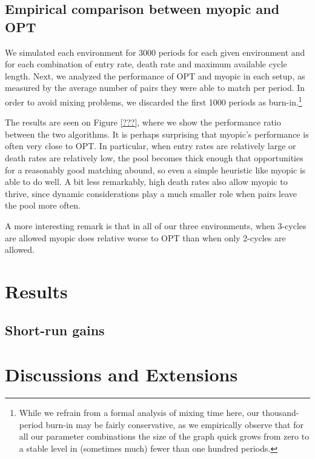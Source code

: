 \documentclass[12pt]{article}
\begin{document}
\subsection{Empirical comparison between myopic and OPT}

We simulated each environment for 3000 periods for each given environment and for each combination of entry rate, death rate and maximum available cycle length. Next, we analyzed the performance of OPT and myopic in each setup, as measured by the average number of pairs they were able to match per period. In order to avoid mixing problems, we discarded the first 1000 periods as burn-in.\footnote{While we refrain from a formal analysis of mixing time here, our thousand-period burn-in may be fairly conservative, as we empirically observe that for all our parameter combinations the size of the graph quick grows from zero to a stable level in (sometimes much) fewer than one hundred periods.}

The results are seen on Figure \ref{???}, where we show the performance ratio between the two algorithms. It is perhaps surprising that myopic's performance is often very close to OPT. In particular, when entry rates are relatively large or death rates are relatively low, the pool becomes thick enough that  opportunities for a reasonably good matching abound, so even a simple heuristic like myopic is able to do well. A bit less remarkably, high death rates also allow myopic to thrive, since dynamic considerations play a much smaller role when pairs leave the pool more often.

A more interesting remark is that in all of our three environments, when 3-cycles are allowed myopic does relative worse to OPT than when only 2-cycles are allowed. 




\section{Results} \label{sec:result}

\clearpage
\subsection{Short-run gains}

\section{Discussions and Extensions} \label{sec:discussion}
\end{document}
